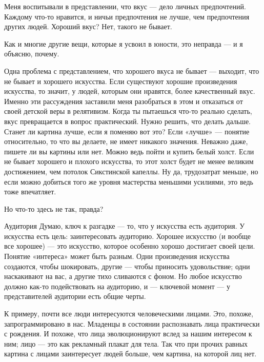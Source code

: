 \documentclass[ebook,12pt,oneside,openany]{memoir}
\begin{document}
\maketitle

Меня воспитывали в представлении, что вкус — дело личных предпочтений.
Каждому что-то нравится, и ничьи предпочтения не лучше, чем
предпочтения других людей. Хороший вкус? Нет, такого не бывает.

Как и многие другие вещи, которые я усвоил в юности, это неправда — и
я объясню, почему.

Одна проблема с представлением, что хорошего вкуса не бывает —
выходит, что не бывает и хорошего искусства. Если существуют хорошие
произведения искусства, то значит, у людей, которым они нравятся,
более качественный вкус. Именно эти рассуждения заставили меня
разобраться в этом и отказаться от своей детской веры в релятивизм.
Когда ты пытаешься что-то реально сделать, вкус превращается в вопрос
практический. Нужно решить, что делать дальше. Станет ли картина
лучше, если я поменяю вот это? Если «лучше» — понятие относительно, то
что вы делаете, не имеет никакого значения. Неважно даже, пишете ли вы
картины или нет. Можно ведь пойти и купить белый холст. Если не бывает
хорошего и плохого искусства, то этот холст будет не менее великим
достижением, чем потолок Сикстинской капеллы. Ну да, трудозатрат
меньше, но если можно добиться того же уровня мастерства меньшими
усилиями, это ведь тоже впечатляет.

Но что-то здесь не так, правда?

Аудитория Думаю, ключ к разгадке — то, что у искусства есть аудитория.
У искусства есть цель: заинтересовать аудиторию. Хорошее искусство (и
вообще все хорошее) — это искусство, которое особенно хорошо достигает
своей цели. Понятие «интереса» может быть разным. Одни произведения
искусства создаются, чтобы шокировать, другие — чтобы приносить
удовольствие; одни наскакивают на вас, а другие тихо сливаются с
фоном. Но любое искусство должно как-то подействовать на аудиторию, и
— ключевой момент — у представителей аудитории есть общие черты.

К примеру, почти все люди интересуются человеческими лицами. Это,
похоже, запрограммировано в нас. Младенцы в состоянии распознавать
лица практически с рождения. И похоже, что лица эволюционируют вслед
за нашим интересом к ним; лицо — это как рекламный плакат для тела.
Так что при прочих равных картина с лицами заинтересует людей больше,
чем картина, на которой лиц нет.
\end{document}
